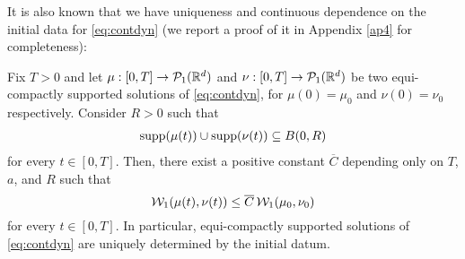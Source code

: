 

%


It is also known \cite{CanCarRos10} that we have uniqueness and continuous dependence on the initial data for \eqref{eq:contdyn} (we report a proof of it in Appendix \ref{ap4} for completeness):

\begin{theorem}\label{uniq}
Fix $T>0$  and let $\mu:[0,T]\rightarrow\mathcal{P}_1(\mathbb{R}^d)$ and $\nu:[0,T]\rightarrow\mathcal{P}_1(\mathbb{R}^d)$ be two equi-compactly supported solutions  of \eqref{eq:contdyn}, for $\mu(0)=\mu_0$ and $\nu(0)=\nu_0$ respectively. Consider $R>0$ such that
\begin{align}\label{supptot}
\operatorname{supp}(\mu(t))\cup\operatorname{supp}(\nu(t)) \subseteq B(0, R)
\end{align}
for every $t \in[0, T]$. Then, there exist a positive constant $\overline{C}$ depending only on $T$, $a$,  and $R$ such that
\begin{equation}\label{stab}
\mathcal{W}_1(\mu(t), \nu(t)) \le \overline{C} \, \mathcal{W}_1(\mu_0, \nu_0)
\end{equation}
for every $t \in [0, T]$. In particular, equi-compactly supported solutions of \eqref{eq:contdyn} are uniquely determined by the initial datum.
\end{theorem}
